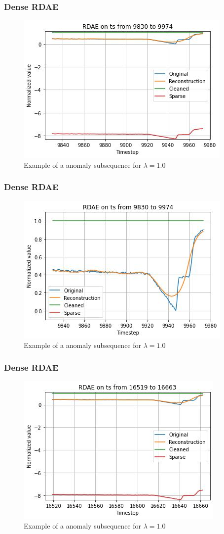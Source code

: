 \documentclass{beamer}
\theoremstyle{plain}
\theoremstyle{definition}
\theoremstyle{remark}
\begin{document}
\begin{frame}
	\frametitle{Dense RDAE}
	\begin{figure}
		\centering
		\includegraphics[width=0.7\linewidth]{Images/lam1.0ts_anomaly9830.jpg}
		\caption[]{Example of a anomaly subsequence for $\lambda=1.0$}
	\end{figure}
\end{frame}

\begin{frame}
	\frametitle{Dense RDAE}
	\begin{figure}
		\centering
		\includegraphics[width=0.7\linewidth]{Images/lam1.0ts_anomalyzoom9830.jpg}
		\caption[]{Example of a anomaly subsequence for $\lambda=1.0$}
	\end{figure}
\end{frame}

\begin{frame}
	\frametitle{Dense RDAE}
	\begin{figure}
		\centering
		\includegraphics[width=0.7\linewidth]{Images/lam1.0ts_anomaly16519.jpg}
		\caption[]{Example of a anomaly subsequence for $\lambda=1.0$}
	\end{figure}
\end{frame}
\end{document}
